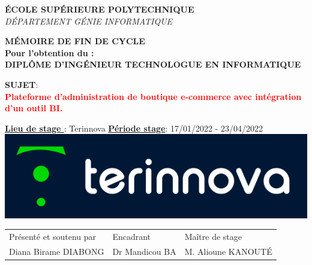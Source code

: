 \documentclass[a4paper, 12pt]{report}
\begin{document}
\begin{titlepage}
\textsc{\small \textbf{ÉCOLE SUPÉRIEURE POLYTECHNIQUE}}\\[0.15cm] %
\textsc{\small {\textit {DÉPARTEMENT GÉNIE INFORMATIQUE}}}\\[0.15cm] %

\begin{tcolorbox}[colback=white,colframe=myblue]
\centering
 \textcolor{myblue}{\small{\textbf{MÉMOIRE DE FIN DE CYCLE}}}\\
\small{\textbf{Pour l’obtention du :} \\
\textbf{DIPLÔME D'INGÉNIEUR TECHNOLOGUE EN INFORMATIQUE}} %
\end{tcolorbox}

\begin{tcolorbox}[colback=white,colframe=myblue]
\centering
\textbf{\small{SUJET}}: \\
\textcolor{red}{\textbf {Plateforme d'administration de boutique e-commerce avec intégration d'un outil BI.}} %
\end{tcolorbox}

 

\begin{tcolorbox}[colback=white,colframe=myblue]
\small{\textbf{\underline{Lieu de stage }}: \textcolor{myblue}{Terinnova} \quad \textbf{\underline{Période stage}}: \textcolor{myblue}{17/01/2022 - 23/04/2022}}\\
\centering \newline
\includegraphics[scale=.6]{img/terinnova.png} %
\end{tcolorbox}

\begin{tcolorbox}[colback=white,colframe=myblue]
\begin{tabular}{lll}
Présenté et soutenu par & Encadrant & Maître de stage\\
Diana Birame DIABONG & Dr Mandicou BA & M. Alioune KANOUTÉ
\end{tabular}
\end{tcolorbox}



\end{titlepage}
\end{document}
